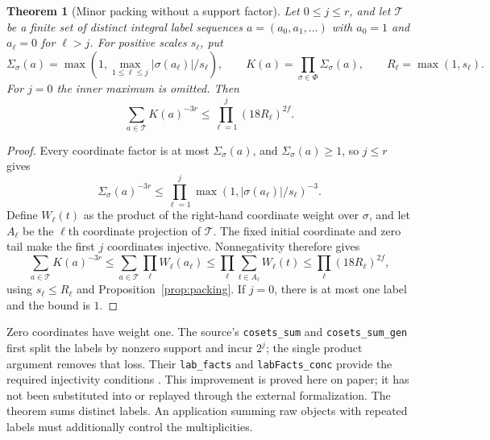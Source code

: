 \documentclass[11pt,letterpaper]{article}
\newtheorem{theorem}{Theorem}[section]
\theoremstyle{definition}
\theoremstyle{remark}
\numberwithin{equation}{section}
\begin{document}
\begin{theorem}[Minor packing without a support factor]\label{thm:minor-sum}
Let $0\le j\le r$, and let $\mathcal T$ be a finite set of distinct integral label sequences $a=(a_0,a_1,\ldots)$ with $a_0=1$ and $a_\ell=0$ for $\ell>j$. For positive scales $s_\ell$, put
\[
 \Sigma_\sigma(a)=\max\left(1,\max_{1\le\ell\le j}
              |\sigma(a_\ell)|/s_\ell\right),\qquad
 K(a)=\prod_{\sigma\in\Phi}\Sigma_\sigma(a),\qquad
 R_\ell=\max(1,s_\ell).
\]
For $j=0$ the inner maximum is omitted. Then
\[
 \boxed{\sum_{a\in\mathcal T}K(a)^{-3r}
      \le\prod_{\ell=1}^j(18R_\ell)^{2f}.}
\]
\end{theorem}
\begin{proof}
Every coordinate factor is at most $\Sigma_\sigma(a)$, and $\Sigma_\sigma(a)\ge1$, so $j\le r$ gives
\[
 \Sigma_\sigma(a)^{-3r}
 \le\prod_{\ell=1}^j\max(1,|\sigma(a_\ell)|/s_\ell)^{-3}.
\]
Define $W_\ell(t)$ as the product of the right-hand coordinate weight over $\sigma$, and let $A_\ell$ be the $\ell$th coordinate projection of $\mathcal T$. The fixed initial coordinate and zero tail make the first $j$ coordinates injective. Nonnegativity therefore gives
\[
 \sum_{a\in\mathcal T}K(a)^{-3r}
 \le\sum_{a\in\mathcal T}\prod_\ell W_\ell(a_\ell)
 \le\prod_\ell\sum_{t\in A_\ell}W_\ell(t)
 \le\prod_\ell(18R_\ell)^{2f},
\]
using $s_\ell\le R_\ell$ and Proposition~\ref{prop:packing}. If $j=0$, there is at most one label and the bound is $1$.
\end{proof}

Zero coordinates have weight one. The source's \texttt{cosets\_sum} and \texttt{cosets\_sum\_gen} first split the labels by nonzero support and incur $2^j$; the single product argument removes that loss. Their \texttt{lab\_facts} and \texttt{labFacts\_conc} provide the required injectivity conditions \cite{minors}. This improvement is proved here on paper; it has not been substituted into or replayed through the external formalization.
The theorem sums distinct labels. An application summing raw objects with repeated labels must additionally control the multiplicities.
\end{document}

